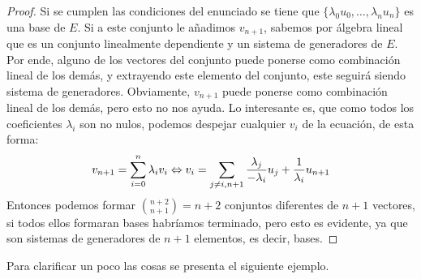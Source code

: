 \begin{proof}
	Si se cumplen las condiciones del enunciado se tiene que $\{\lambda_0u_0,\dots,\lambda_nu_n\}$ es una base de $E$. Si a este conjunto le añadimos $v_{n+1}$, sabemos por álgebra lineal que es un conjunto linealmente dependiente y un sistema de generadores de $E$. Por ende, alguno de los vectores del conjunto puede ponerse como combinación lineal de los demás, y extrayendo este elemento del conjunto, este seguirá siendo sistema de generadores. Obviamente, $v_{n+1}$ puede ponerse como combinación lineal de los demás, pero esto no nos ayuda. Lo interesante es, que como todos los coeficientes $\lambda_i$ son no nulos, podemos despejar cualquier $v_i$ de la ecuación, de esta forma:
	\[v_{n+1}=\sum_{i=0}^{n}\lambda_iv_i\Leftrightarrow v_i = \sum_{j\not=i,n+1}\frac{\lambda_j}{-\lambda_i}u_j+\frac{1}{\lambda_i}u_{n+1}\]
	Entonces podemos formar $\binom{n+2}{n+1}=n+2$ conjuntos diferentes de $n+1$ vectores, si todos ellos formaran bases habríamos terminado, pero esto es evidente, ya que son sistemas de generadores de $n+1$ elementos, es decir, bases.
\end{proof}
Para clarificar un poco las cosas se presenta el siguiente ejemplo.

